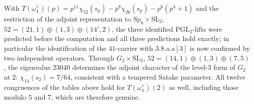 \documentclass[11pt]{amsart}
\theoremstyle{definition}
\begin{document}
With $T(\omega_4^\vee)(p)=p^{11}\chi_{52}(s_p)-p^8\chi_{26}(s_p)-p^6(p^4+1)$ and the restriction of the adjoint representation to $\mathrm{Sp}_6\times\mathrm{SL}_2$, $52=(21,1)\oplus(1,3)\oplus(14',2)$, the three identified $\mathrm{PGL}_2$-lifts were predicted before the computation and all three predictions hold exactly; in particular the identification of the $41$-carrier with \textsf{3.8.a.a}$[3]$ is now confirmed by two independent operators. Through $G_2\times\mathrm{SL}_2$, $52=(14,1)\oplus(1,3)\oplus(7,5)$, the eigenvalue $23040$ determines the adjoint character of the level-$3$ form of $G_2$ at $2$: $\chi_{14}(s_2)=7/64$, consistent with a tempered Satake parameter. All twelve congruences of the tables above hold for $T(\omega_4^\vee)(2)$ as well, including those modulo $5$ and $7$, which are therefore genuine.
\end{document}
